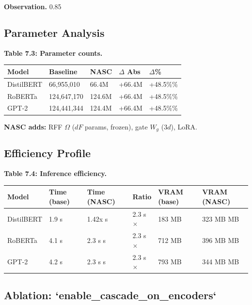 \textbf{Observation.} 0.85

\subsection{Parameter Analysis}

\textbf{Table 7.3: Parameter counts.}

\begin{table}[H]
\centering
\small
\begin{tabular}{lllll}
\toprule
\textbf{Model} & \textbf{Baseline} & \textbf{NASC} & \textbf{$\Delta$ Abs} & \textbf{$\Delta$\%} \\
\midrule
DistilBERT & 66,955,010 & 66.4M & +66.4M & +48.5\%\% \\
RoBERTa & 124,647,170 & 124.6M & +66.4M & +48.5\%\% \\
GPT-2 & 124,441,344 & 124.4M & +66.4M & +48.5\%\% \\
\bottomrule
\end{tabular}
\end{table}

\textbf{NASC adds:} RFF $\Omega$ ($dF$ params, frozen), gate $W_g$ ($3d$), LoRA.

\subsection{Efficiency Profile}

\textbf{Table 7.4: Inference efficiency.}

\begin{table}[H]
\centering
\small
\begin{tabular}{llllll}
\toprule
\textbf{Model} & \textbf{Time (base)} & \textbf{Time (NASC)} & \textbf{Ratio} & \textbf{VRAM (base)} & \textbf{VRAM (NASC)} \\
\midrule
DistilBERT & 1.9 s & 1.42x s & 2.3 s$\times$ & 183 MB & 323 MB MB \\
RoBERTa & 4.1 s & 2.3 s s & 2.3 s$\times$ & 712 MB & 396 MB MB \\
GPT-2 & 4.2 s & 2.3 s s & 2.3 s$\times$ & 793 MB & 344 MB MB \\
\bottomrule
\end{tabular}
\end{table}

\subsection{Ablation: `enable\_cascade\_on\_encoders`}


